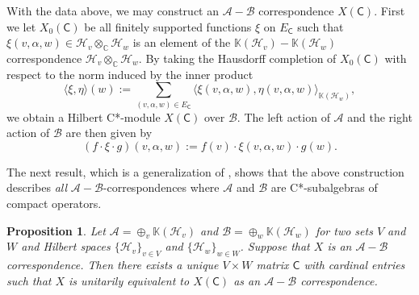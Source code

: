 \documentclass[11pt, letterpaper,final]{amsart}
\newcommand{\A}{{\mathcal{A}}}
\newcommand{\B}{{\mathcal{B}}}
\renewcommand{\H}{{\mathcal{H}}}
\newcommand{\bbK}{{\mathbb{K}}}
\newtheorem{prp}[thm]{Proposition}
\theoremstyle{definition}
\begin{document}
With the data above, we may construct an $\A-\B$ correspondence $X(\mathsf{C})$. First we let $X_0(\mathsf{C})$ be all finitely supported functions $\xi$ on $E_\mathsf{C}$ such that $\xi(v,\alpha,w) \in \H_v \otimes_\mathbb{C} \H_w$ is an element of the $\bbK(\H_v)-\bbK(\H_w)$ correspondence $\H_v \otimes_\mathbb{C} \H_w$. By taking the Hausdorff completion of $X_0(\mathsf{C})$ with respect to the norm induced by the inner product
$$
\langle \xi,\eta \rangle(w) :=\sum_{(v,\alpha,w) \in E_\mathsf{C}}\langle \xi(v,\alpha,w),\eta(v,\alpha,w) \rangle_{\bbK(\H_w)},
$$
we obtain a Hilbert C*-module $X(\mathsf{C})$ over $\B$. The left action of $\A$ and the right action of $\B$ are then given by
$$
(f\cdot \xi \cdot g)(v,\alpha,w) := f(v) \cdot \xi(v,\alpha, w) \cdot g(w).
$$


The next result, which is a generalization of \cite[Proposition 3.2]{CDE}, shows that the above construction describes \emph{all} $\A-\B$-correspondences where $\A$ and $\B$ are C*-subalgebras of compact operators.

\begin{prp} \label{pr:corovercmpt}
Let $\A = \oplus_v \bbK(\H_v)$ and $\B = \oplus_w \bbK(\H_w)$ for two sets $V$ and $W$ and Hilbert spaces $\{\H_v\}_{v\in V}$ and $\{\H_w\}_{w\in W}$. Suppose that $X$ is an $\A-\B$ correspondence. Then there exists a \emph{unique} $V\times W$ matrix $\mathsf{C}$ with cardinal entries such that $X$ is unitarily equivalent to $X(\mathsf{C})$ as an $\A-\B$ correspondence.
\end{prp}
\end{document}
